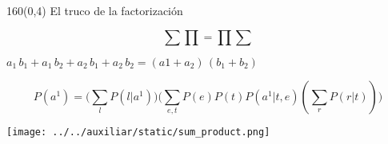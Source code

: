 \documentclass[shownotes,aspectratio=169]{beamer}
\begin{document}
\begin{frame}[plain]
\begin{textblock}{160}(0,4)
 \centering \Large El truco de la factorización
\end{textblock}
\vspace{1.5cm} \centering

\begin{equation*}
\sum \prod = \prod \sum
\end{equation*}

$a_1 \, b_1 + a_1 \, b_2 + a_2 \, b_1 + a_2 \, b_2  = (a1 + a_2) \, (b_1 + b_2)$

\pause

\begin{equation*}
   P(a^1) = \Big(\sum_l P(l|a^1) \Big) \Big(\sum_{e,t} P(e)P(t)P(a^1|t,e)(\sum_r P(r|t)) \Big)
\end{equation*}

  \texttt{[image: ../../auxiliar/static/sum\_product.png]}

\end{frame}
\end{document}
